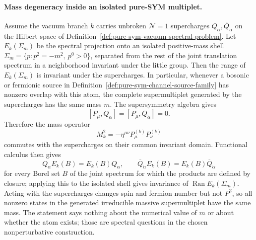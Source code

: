 \paragraph{Mass degeneracy inside an isolated pure-SYM multiplet.}
Assume the vacuum branch \(k\) carries unbroken \(\mathcal N=1\) supercharges
\(Q_\alpha,\overline Q_{\dot\alpha}\) on the Hilbert space of
Definition~\ref{def:pure-sym-vacuum-spectral-problem}.  Let \(E_k(\Sigma_m)\)
be the spectral projection onto an isolated positive-mass shell
\(\Sigma_m=\{p:p^2=-m^2,\ p^0>0\}\), separated from the rest of the joint
translation spectrum in a neighborhood invariant under the little group.
Then the range of \(E_k(\Sigma_m)\) is invariant under the supercharges.  In
particular, whenever a bosonic or fermionic source in
Definition~\ref{def:pure-sym-channel-source-family} has nonzero overlap with
this atom, the complete supermultiplet generated by the supercharges has the
same mass \(m\).
The supersymmetry algebra gives
\[
  [P_\mu,Q_\alpha]=[P_\mu,\overline Q_{\dot\alpha}]=0.
\]
Therefore the mass operator
\[
  M_k^2=-\eta^{\mu\nu}P_\mu^{(k)}P_\nu^{(k)}
\]
commutes with the supercharges on their common invariant domain.  Functional
calculus then gives
\[
  Q_\alpha E_k(B)=E_k(B)Q_\alpha,\qquad
  \overline Q_{\dot\alpha}E_k(B)=E_k(B)\overline Q_{\dot\alpha}
\]
for every Borel set \(B\) of the joint spectrum for which the products are
defined by closure; applying this to the isolated shell gives invariance of
\(\operatorname{Ran}E_k(\Sigma_m)\).  Acting with the supercharges changes
spin and fermion number but not \(P^2\), so all nonzero states in the generated
irreducible massive supermultiplet have the same mass.  The statement says
nothing about the numerical value of \(m\) or about whether the atom exists;
those are spectral questions in the chosen nonperturbative construction.

